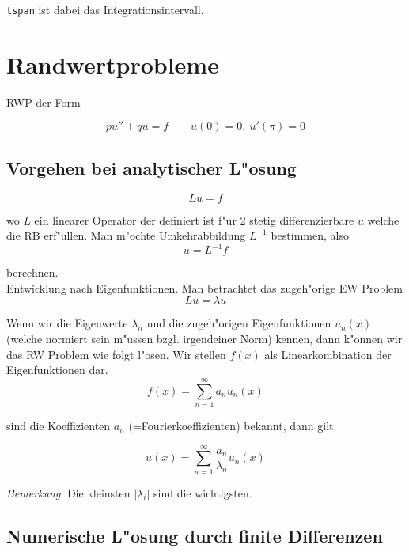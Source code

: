 \documentclass[german, 10pt, a4paper, twocolumn]{scrartcl}
\theoremstyle{definition}
\begin{document}
\texttt{tspan} ist dabei das Integrationsintervall.

\section{Randwertprobleme}

RWP der Form

\begin{displaymath}
	pu'' + qu = f \qquad u(0)= 0, \ u'(\pi)=0
\end{displaymath}

\subsection{Vorgehen bei analytischer L"osung}

\begin{displaymath}
	L u = f
\end{displaymath}

wo $L$ ein linearer Operator der definiert ist f"ur 2 stetig differenzierbare $u$ welche die RB erf"ullen. Man m"ochte Umkehrabbildung $L^{-1}$ bestimmen, also
\begin{displaymath}
	u = L^{-1} f
\end{displaymath}

berechnen.\\
Entwicklung nach Eigenfunktionen. Man betrachtet das zugeh"orige EW Problem
\begin{displaymath}
	L u = \lambda u
\end{displaymath}

Wenn wir die Eigenwerte $\lambda_n$ und die zugeh"origen Eigenfunktionen $u_n(x)$ (welche normiert sein m"ussen bzgl. irgendeiner Norm) kennen, dann k"onnen wir das RW Problem wie folgt l"osen. Wir stellen $f(x)$ als Linearkombination der Eigenfunktionen dar.
\begin{displaymath}
	f(x) = \sum^\infty_{n=1} a_n u_n (x)
\end{displaymath}

sind die Koeffizienten $a_n$ (=Fourierkoeffizienten) bekannt, dann gilt

\begin{displaymath}
	u(x) = \sum^\infty_{n=1} \frac{a_n}{\lambda_n} u_n(x)
\end{displaymath}

\textit{Bemerkung}: Die kleinsten $|\lambda_i|$ sind die wichtigsten.

\subsection{Numerische L"osung durch finite Differenzen}
\end{document}
